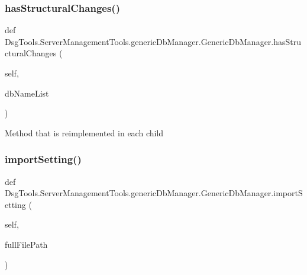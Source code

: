 \subsubsection{\texorpdfstring{has\+Structural\+Changes()}{hasStructuralChanges()}}
{\footnotesize\ttfamily def Dsg\+Tools.\+Server\+Management\+Tools.\+generic\+Db\+Manager.\+Generic\+Db\+Manager.\+has\+Structural\+Changes (\begin{DoxyParamCaption}\item[{}]{self,  }\item[{}]{db\+Name\+List }\end{DoxyParamCaption})}

\begin{DoxyVerb}Method that is reimplemented in each child
\end{DoxyVerb}
 \mbox{\label{class_dsg_tools_1_1_server_management_tools_1_1generic_db_manager_1_1_generic_db_manager_af254decbd6cb86cdcf93e681df9bcb4f}} 
\subsubsection{\texorpdfstring{import\+Setting()}{importSetting()}}
{\footnotesize\ttfamily def Dsg\+Tools.\+Server\+Management\+Tools.\+generic\+Db\+Manager.\+Generic\+Db\+Manager.\+import\+Setting (\begin{DoxyParamCaption}\item[{}]{self,  }\item[{}]{full\+File\+Path }\end{DoxyParamCaption})}

